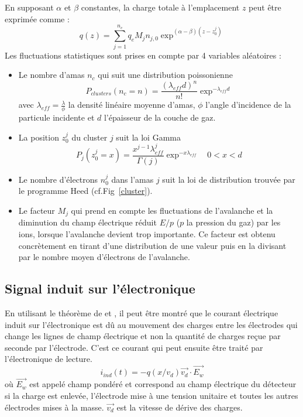 En supposant $\alpha$ et $\beta$ constantes, la charge totale à l'emplacement $z$ peut être exprimée comme :
\begin{equation}
q(z)=\sum_{j=1}^{n_c}q_{e}M_{j}n_{j,0}\exp^{(\alpha-\beta)(z-z_0^j)}
\end{equation}
\newpage
Les fluctuations statistiques sont prises en compte par \num{4} variables aléatoires :
\begin{itemize}[label=$\bullet$]
	\item Le nombre d'amas $n_c$ qui suit une distribution poissonienne 
	\begin{equation}
	P_{clusters}(n_c=n)=\frac{(\lambda_{eff}d)^{n}}{n!}\exp^{-\lambda_{eff}d}
	\end{equation}
	avec $\lambda_{eff}=\frac{\lambda}{\phi}$ la densité linéaire moyenne d'amas, $\phi$ l'angle d'incidence de la particule incidente et $d$ l'épaisseur de la couche de gaz.
	\item La position $z_0^j$ du cluster $j$ suit la loi Gamma
	\begin{equation}
	P_{j}(z_0^j=x)=\frac{x^{j-1}\lambda_{eff}^{j}}{\Gamma(j)}\exp^{-x\lambda_{eff}} \quad 0<x<d
	\end{equation}
	\item Le nombre d'électrons $n_{0}^{j}$ dans l'amas $j$ suit la loi de distribution trouvée par le programme Heed (cf.Fig~\ref{cluster}).
	\item Le facteur $M_{j}$ qui prend en compte les fluctuations de l'avalanche et la diminution du champ électrique réduit $E/p$ ($p$ la pression du gaz) par les ions, lorsque l'avalanche devient trop importante. Ce facteur est obtenu concrètement en tirant d'une distribution de  une valeur puis en la divisant par le nombre moyen d'électrons de l'avalanche.
\end{itemize}
\vspace*{-0.2cm}
\subsection{Signal induit sur l'électronique}
\vspace*{-0.6cm}
En utilisant le théorème de  et  \cite{HE2001250}, il peut être montré que le courant électrique induit sur l'électronique est dû au mouvement des charges entre les électrodes qui change les lignes de champ électrique et non la quantité de charges reçue par seconde par l'électrode. C'est ce courant qui peut ensuite être traité par l'électronique de lecture.
\begin{equation}
i_{ind}(t)=-q(x/v_{d})\vec{v_{d}}\cdot \overrightarrow{E_{w}}
\end{equation}
où $\overrightarrow{E_{w}}$ est appelé champ pondéré et correspond au champ électrique du détecteur si la charge est enlevée, l'électrode mise à une tension unitaire  et toutes les autres électrodes mises à la masse. $\vec{v_{d}}$ est la vitesse de dérive des charges.

